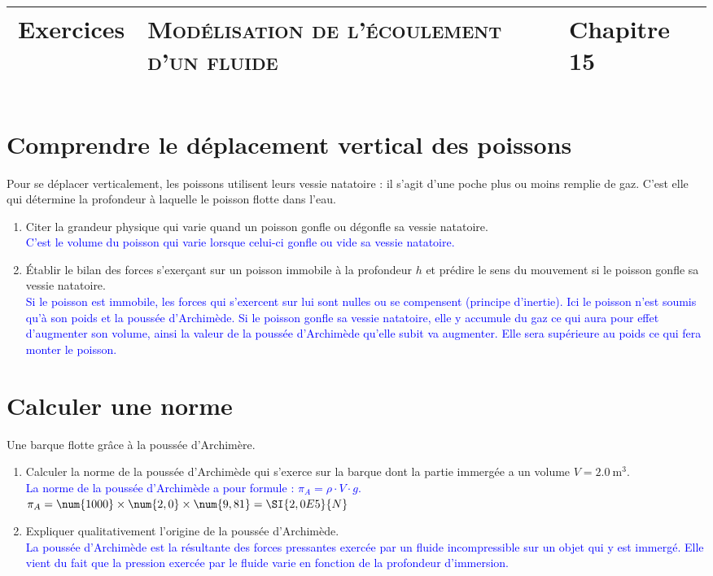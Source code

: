 \documentclass[a4paper,11pt,fleqn,usenames,dvipsnames]{article}%
\title{\vspace{-1cm}\large 
	\begin{tabular}{|>{\centering}m{5cm}|>{\centering}m{8cm}|>{\centering\arraybackslash}m{4cm}|}
		\hline
		Exercices & \textbf{\textsc{Modélisation de l'écoulement d'un fluide}} &  Chapitre 15 \\
		\hline
\end{tabular}
\vspace{-5em}}
\date{}
\begin{document}
	\maketitle
\section{Comprendre le déplacement vertical des poissons}
Pour se déplacer verticalement, les poissons utilisent leurs vessie natatoire : il s'agit d'une poche plus ou moins remplie de gaz. C'est elle qui détermine la profondeur à laquelle le poisson flotte dans l'eau.
\begin{enumerate}
	\item Citer la grandeur physique qui varie quand un poisson gonfle ou dégonfle sa vessie natatoire.\\
	\textcolor{blue}{C'est le volume du poisson qui varie lorsque celui-ci gonfle ou vide sa vessie natatoire.}
	\item Établir le bilan des forces s'exerçant sur un poisson immobile à la profondeur $h$ et prédire le sens du mouvement si le poisson gonfle sa vessie natatoire.\\
	\textcolor{blue}{Si le poisson est immobile, les forces qui s'exercent sur lui sont nulles ou se compensent (principe d'inertie). Ici le poisson n'est soumis qu'à son poids et la poussée d'Archimède. Si le poisson gonfle sa vessie natatoire, elle y accumule du gaz ce qui aura pour effet d'augmenter son volume, ainsi la valeur de la poussée d'Archimède qu'elle subit va  augmenter. Elle sera supérieure au poids ce qui fera monter le poisson.}
\end{enumerate}

\section{Calculer une norme}
Une barque flotte grâce à la poussée d'Archimère.
\begin{enumerate}
	\item Calculer la norme de la poussée d'Archimède qui s'exerce sur la barque dont la partie immergée a un volume $V=\SI{2,0}{\meter\cubed}$.\\
	\textcolor{blue}{La norme de la poussée d'Archimède a pour formule : $\pi_A = \rho\cdot V\cdot g$.\\
	 $\pi_A = \num{1000} \times \num{2,0} \times \num{9,81} =\SI{2,0E5}{N}$}
	\item Expliquer qualitativement l'origine de la poussée d'Archimède.\\
	\textcolor{blue}{La poussée d'Archimède est la résultante des forces pressantes exercée par un fluide incompressible sur un objet qui y est immergé. Elle vient du fait que la pression exercée par le fluide varie en fonction de la profondeur d'immersion.}
\end{enumerate}
\end{document}
